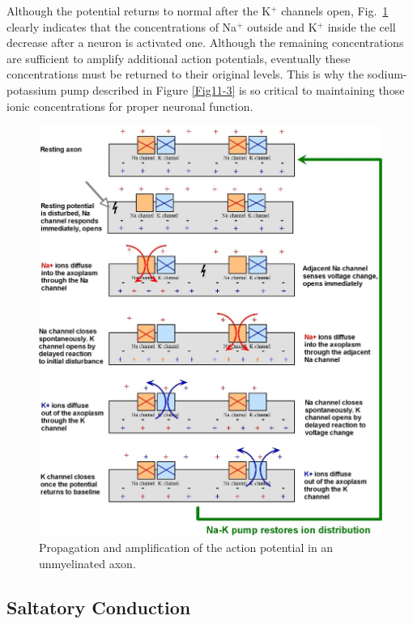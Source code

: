 Although the potential returns to normal after the K$^+$ channels open, Fig.~\ref{Fig11-16} clearly indicates that the concentrations of Na$^+$ outside and K$^+$ inside the cell decrease after a neuron is activated one. Although the remaining concentrations are sufficient to amplify additional action potentials, eventually these concentrations must be returned to their original levels. This is why the sodium-potassium pump described in Figure \ref{Fig11-3}  is so critical to maintaining those ionic concentrations for proper neuronal function.
\begin{figure}[!htb]
	\centering
	\includegraphics[width=\textwidth]{./figures/Topic11/Fig11-16.jpg}
	\caption{Propagation and amplification of the action potential in an unmyelinated axon.}
	\label{Fig11-16}
\end{figure}

\subsection{Saltatory Conduction}


